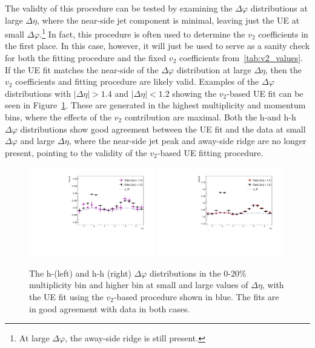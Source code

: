 The validty of this procedure can be tested by examining the $\Delta\varphi$ distributions at large $\Delta\eta$, where the near-side jet component is minimal, leaving just the UE at small $\Delta\varphi$.\footnote{At large $\Delta\varphi$, the away-side ridge is still present.} In fact, this procedure is often used to determine the $v_{2}$ coefficients in the first place. In this case, however, it will just be used to serve as a sanity check for both the fitting procedure and the fixed $v_{2}$ coefficients from~\ref{tab:v2_values}. If the UE fit matches the near-side of the $\Delta\varphi$ distribution at large $\Delta\eta$, then the $v_{2}$ coefficients and fitting procedure are likely valid. Examples of the $\Delta\varphi$ distributions with $|\Delta\eta| > 1.4$ and $|\Delta\eta| < 1.2$ showing the $v_{2}$-based UE fit can be seen in Figure~\ref{fig:v2_fit_large_deta}. These are generated in the highest multiplicity and momentum bins, where the effects of the $v_{2}$ contribution are maximal. Both the h-\lmb and h-h $\Delta\varphi$ distributions show good agreement between the UE fit and the data at small $\Delta\varphi$ and large $\Delta\eta$, where the near-side jet peak and away-side ridge are no longer present, pointing to the validity of the $v_{2}$-based UE fitting procedure.

\begin{figure}[ht]
    \centering
    \includegraphics[width=0.49\textwidth]{figures/analysis/v2fit_largedeta_h_lambda_cent_0_20_trigger_4_8_assoc_25_4.pdf}
    \includegraphics[width=0.49\textwidth]{figures/analysis/v2fit_largedeta_h_h_cent_0_20_trigger_4_8_assoc_25_4.pdf}
    \caption{The h-\lmb (left) and h-h (right) $\Delta\varphi$ distributions in the 0-20\% multiplicity bin and higher \pt bin at small and large values of $\Delta\eta$, with the UE fit using the $v_{2}$-based procedure shown in blue. The fits are in good agreement with data in both cases.}
    \label{fig:v2_fit_large_deta}
\end{figure}

